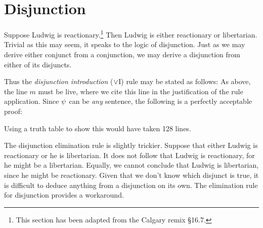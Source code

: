 \section{Disjunction}

Suppose Ludwig is reactionary.\footnote{This section has been adapted from the Calgary remix \S16.7.}
Then Ludwig is either reactionary or libertarian.
Trivial as this may seem, it speaks to the logic of disjunction.
Just as we may derive either conjunct from a conjunction, we may derive a disjunction from either of its disjuncts.

Thus the \textit{disjunction introduction} ($\vee$I) rule may be stated as follows:
As above, the line $m$ must be live, where we cite this line in the justification of the rule application. 
Since $\psi$ can be \emph{any} sentence, the following is a perfectly acceptable proof:
\begin{fitchproof}
	 \pr{}
\end{fitchproof}
Using a truth table to show this would have taken 128 lines.

The disjunction elimination rule is slightly trickier.
Suppose that either Ludwig is reactionary or he is libertarian.
It does not follow that Ludwig is reactionary, for he might be a libertarian.
Equally, we cannot conclude that Ludwig is libertarian, since he might be reactionary.
Given that we don't know which disjunct is true, it is difficult to deduce anything from a disjunction on its own.
The elimination rule for disjunction provides a workaround.


